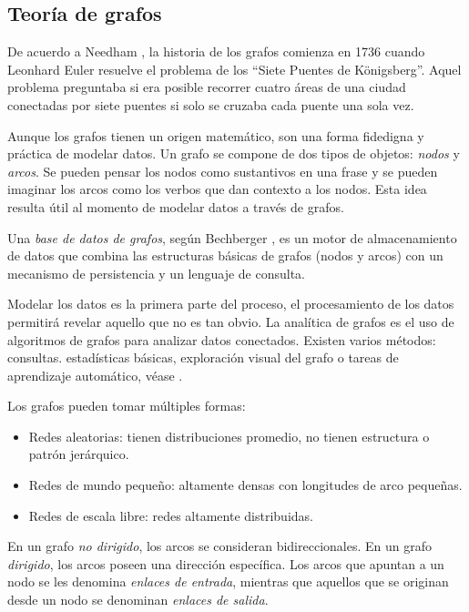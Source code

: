 \documentclass[11pt,letterpaper,oneside]{article}
\begin{document}
	\newpage
	
	\subsection{Teoría de grafos}
	De acuerdo a Needham \cite{Needham-2019}, la historia de los grafos comienza en 1736 cuando Leonhard Euler resuelve el problema de los ``Siete Puentes de K\"{o}nigsberg''. Aquel problema preguntaba si era posible recorrer cuatro áreas de una ciudad conectadas por siete puentes si solo se cruzaba cada puente una sola vez.
	
	Aunque los grafos tienen un origen matemático, son una forma fidedigna y práctica de modelar datos. Un grafo se compone de dos tipos de objetos: \textit{nodos} y \textit{arcos}. Se pueden pensar los nodos como sustantivos en una frase y se pueden imaginar los arcos como los verbos que dan contexto a los nodos. Esta idea resulta útil al momento de modelar datos a través de grafos.
	
	Una \textit{base de datos de grafos}, según Bechberger \cite{Bechberger-2020}, es un motor de almacenamiento de datos que combina las estructuras básicas de grafos (nodos y arcos) con un mecanismo de persistencia y un lenguaje de consulta.
	
	Modelar los datos es la primera parte del proceso, el procesamiento de los datos permitirá revelar aquello que no es tan obvio. La analítica de grafos es el uso de algoritmos de grafos para analizar datos conectados. Existen varios métodos: consultas. estadísticas básicas, exploración visual del grafo o tareas de aprendizaje automático, véase \cite{Robinson-2013}.
	
	Los grafos pueden tomar múltiples formas:
	\begin{itemize}
	\item Redes aleatorias: tienen distribuciones promedio, no tienen estructura o patrón jerárquico.
	\item Redes de mundo pequeño: altamente densas con longitudes de arco pequeñas.
	\item Redes de escala libre: redes altamente distribuidas.
	\end{itemize}
	
	
	En un grafo \textit{no dirigido}, los arcos se consideran bidireccionales. En un grafo \textit{dirigido}, los arcos poseen una dirección específica. Los arcos que apuntan a un nodo se les denomina \textit{enlaces de entrada}, mientras que aquellos que se originan desde un nodo se denominan \textit{enlaces de salida}.
	
\end{document}
